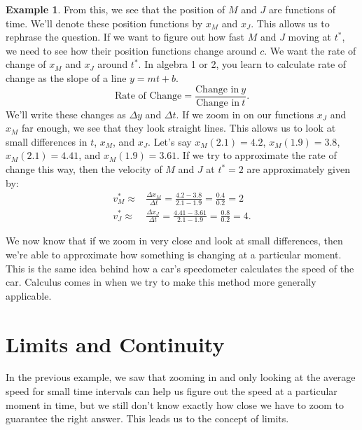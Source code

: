 \documentclass[12pt]{article}
\theoremstyle{definition}
\newtheorem{exmp}[thm]{Example}
\theoremstyle{plain}
\numberwithin{equation}{section}
\begin{document}
\begin{exmp}
From this, we see that the position of $M$ and $J$ are functions of time. We'll denote these position functions by $x_M$ and $x_J$. This allows us to rephrase the question. If we want to figure out how fast $M$ and $J$ moving at $t^*$, we need to see how their position functions change around $c$. We want  the rate of change of $x_M$ and $x_J$ around $t^*$. In algebra 1 or 2, you learn to calculate rate of change as the slope of a line $y=mt+b$.
\begin{equation*}
	\text{Rate of Change}=\frac{\text{Change in}\ y  }{\text{Change in}\ t}.
\end{equation*}
We'll write these changes as $\Delta y$ and $\Delta t$. If we zoom in on our functions $x_J$ and $x_M$ far enough, we see that they look straight lines. This allows us to look at small differences in $t$, $x_M$, and $x_J$. Let's say $x_M(2.1)=4.2$, $x_M(1.9)=3.8$, $x_M(2.1)=4.41$, and $x_M(1.9)= 3.61$. If we try to approximate the rate of change this way, then the velocity of $M$ and $J$ at $t^*=2$ are approximately given by: \begin{align}
	v^*_M\approx&\frac{\Delta x_M}{\Delta t}=\frac{4.2-3.8}{2.1-1.9}=\frac{0.4}{0.2}=2\\
	v^*_J\approx&\frac{\Delta x_J}{\Delta t}=\frac{4.41-3.61}{2.1-1.9}=\frac{0.8}{0.2}=4.
\end{align}

We now know that if we zoom in very close and look at small differences, then we're able to approximate how something is changing at a particular moment. This is the same idea behind how a car's speedometer calculates the speed of the car. Calculus comes in when we try to make this method more generally applicable.
\end{exmp}


\section{Limits and Continuity}


In the previous example, we saw that zooming in and only looking at the average speed for small time intervals can help us figure out the speed at a particular moment in time, but we still don't know exactly how close we have to zoom to guarantee the right answer. This leads us to the concept of limits.\\
\end{document}

